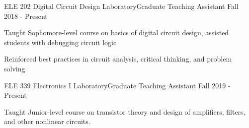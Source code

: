 \gradheader
\begin{cvprojectentries}
  {ELE 202 {\cdotp} Digital Circuit Design Laboratory}{Graduate Teaching Assistant}
  {Fall 2018 - Present}
  {
    \begin{cvitems}
        \item{Taught Sophomore-level course on basics of digital circuit design, assisted students with debugging circuit logic}
        \item{Reinforced best practices in circuit analysis, critical thinking, and problem solving}
    \end{cvitems}
  }
  {ELE 339 {\cdotp} Electronics I Laboratory}{Graduate Teaching Assistant}
  {Fall 2019 - Present}
  {
    \begin{cvitems}
    \item{Taught Junior-level course on transistor theory and design of amplifiers, filters, and other nonlinear circuits.}
    \end{cvitems}
  }
\end{cvprojectentries}
